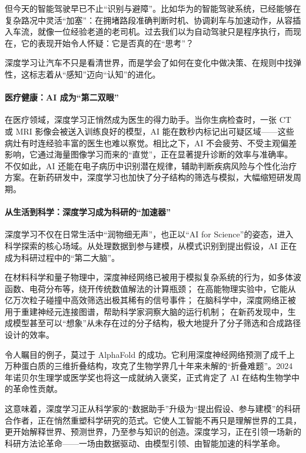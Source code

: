 但今天的智能驾驶早已不止“识别与避障”。比如华为的智能驾驶系统，已经能够在复杂路况中灵活“加塞”：在拥堵路段准确判断时机、协调刹车与加速动作，从容插入车流，就像一位经验老道的老司机。过去我们以为自动驾驶只是程序执行，而现在，它的表现开始令人怀疑：它是否真的在“思考”？

深度学习让汽车不只是看清世界，而是学会了如何在变化中做决策、在规则中找弹性，这标志着从“感知”迈向“认知”的进化。
    
\paragraph{医疗健康：AI 成为“第二双眼”}
    
在医疗领域，深度学习正悄然成为医生的得力助手。当你生病检查时，一张 CT 或 MRI 影像会被送入训练良好的模型，AI 能在数秒内标记出可疑区域——这些病灶有时连经验丰富的医生也难以察觉。相比之下，AI 不会疲劳、不受主观偏差影响，它通过海量图像学习而来的“直觉”，正在显著提升诊断的效率与准确率。
不仅如此，AI 还能在电子病历中识别潜在规律，辅助判断疾病风险与个性化治疗方案。在新药研发中，深度学习也加快了分子结构的筛选与模拟，大幅缩短研发周期。

\paragraph{从生活到科学：深度学习成为科研的“加速器”}  
深度学习不仅在日常生活中“润物细无声”，也正以“AI for Science”的姿态，进入科学探索的核心场域。从处理数据到参与建模，从模式识别到提出假设，AI 正在成为科研过程中的“第二大脑”。

在材料科学和量子物理中，深度神经网络已被用于模拟复杂系统的行为，如多体波函数、电荷分布等，绕开传统数值解法的计算瓶颈；
在高能物理实验中，它能从亿万次粒子碰撞中高效筛选出极其稀有的信号事件；
在脑科学中，深度网络正被用于重建神经元连接图谱，帮助科学家洞察大脑的运行机制；
在新药发现中，生成模型甚至可以“想象”从未存在过的分子结构，极大地提升了分子筛选和合成路径设计的效率。

令人瞩目的例子，莫过于 AlphaFold 的成功。它利用深度神经网络预测了成千上万种蛋白质的三维折叠结构，攻克了生物学界几十年来未解的“折叠难题”。2024 年诺贝尔生理学或医学奖也将这一成就纳入褒奖，正式肯定了 AI 在结构生物学中的革命性贡献。

这意味着，深度学习正从科学家的“数据助手”升级为“提出假设、参与建模”的科研合作者，正在悄然重塑科学研究的范式。它使人工智能不再只是理解世界的工具，更开始解释世界、预测世界，乃至参与知识的创造。深度学习，正在引领一场新的科研方法论革命——一场由数据驱动、由模型引领、由智能加速的科学革命。

